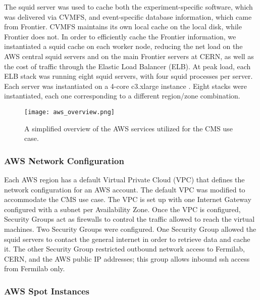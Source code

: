 \documentclass[twocolumn]{svjour3}          %
\begin{document}
The squid server was used to cache both the experiment-specific software, which was delivered via CVMFS, and event-specific database information, which came from Frontier. CVMFS maintains its own local cache on the local disk, while Frontier does not. In order to efficiently cache the Frontier information, we instantiated a squid cache on each worker node, reducing the net load on the AWS central squid servers and on the main Frontier servers at CERN, as well as the cost of traffic through the Elastic Load Balancer (ELB).
At peak load, each ELB stack was running eight squid servers, with four squid processes per server. Each server was instantiated on a 4-core c3.xlarge instance \cite{aws_types}.
Eight stacks were instantiated, each one corresponding to a different region/zone combination.


\begin{figure}
\centering
 \texttt{[image: aws\_overview.png]}
\caption{\label{fig:aws_arch}A simplified overview of the AWS services utilized for the CMS use case.}
\end{figure}


\subsubsection{AWS Network Configuration}

Each AWS region has a default Virtual Private Cloud (VPC) that defines the network configuration for an AWS account. The default VPC was modified to accommodate the CMS use case. The VPC is set up with one Internet Gateway configured with a subnet per Availability Zone. Once the VPC is configured, Security Groups act as firewalls to control the traffic allowed to reach the virtual machines. Two Security Groups were configured. One Security Group allowed the squid servers to contact the general internet in order to retrieve data and cache it. The other Security Group restricted outbound network access to Fermilab, CERN, and the AWS public IP addresses; this group allows inbound ssh access from Fermilab only.

\subsubsection{AWS Spot Instances}
\end{document}
